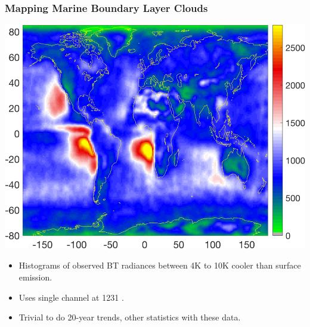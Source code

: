\documentclass[10pt,t]{beamer}
\begin{document}
\begin{frame}
\frametitle{Mapping Marine Boundary Layer Clouds}
\vspace{-0.1in}
\begin{center}
\includegraphics[width=0.7\linewidth]{./Figslls/map_mbl_4K_to_10K_with_land.png}
\end{center}
\begin{small}
\begin{itemize}
\item Histograms of observed BT radiances between 4K to 10K cooler than surface emission.
\item Uses single channel at 1231 \wn.
\item Trivial to do 20-year trends, other statistics with these data.
\end{itemize}
\end{small}
\end{frame}
\end{document}
